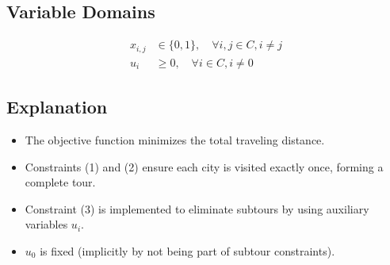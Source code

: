 \documentclass{article}
\begin{document}
\subsection*{Variable Domains}
\begin{align}
x_{i,j} &\in \{0, 1\}, \quad \forall i, j \in C, i \neq j \\
u_i &\geq 0, \quad \forall i \in C, i \neq 0
\end{align}

\subsection*{Explanation}
\begin{itemize}
    \item The objective function minimizes the total traveling distance.
    \item Constraints (1) and (2) ensure each city is visited exactly once, forming a complete tour.
    \item Constraint (3) is implemented to eliminate subtours by using auxiliary variables \( u_i \).
    \item \( u_0 \) is fixed (implicitly by not being part of subtour constraints).
\end{itemize}
\end{document}
